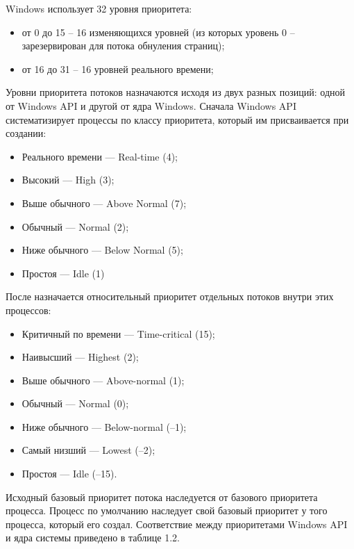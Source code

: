 Windows использует 32 уровня приоритета:
\begin{itemize}
	\item от 0 до 15 – 16 изменяющихся уровней (из которых уровень 0 – зарезервирован для потока обнуления страниц);
	\item от 16 до 31 – 16 уровней реального времени;
\end{itemize}
Уровни приоритета потоков назначаются исходя из двух разных позиций: одной от Windows API и другой от ядра Windows.
Сначала Windows API систематизирует процессы по классу приоритета, который им присваивается при создании:

\begin{itemize}
	\item Реального времени — Real-time (4);
	\item Высокий — High (3);
	\item Выше обычного — Above Normal (7);
	\item Обычный — Normal (2);
	\item Ниже обычного — Below Normal (5);
	\item Простоя — Idle (1)
\end{itemize}

После назначается относительный приоритет отдельных потоков внутри этих процессов:

\begin{itemize}
	\item Критичный по времени — Time-critical (15);
	\item Наивысший — Highest (2);
	\item Выше обычного — Above-normal (1);
	\item Обычный — Normal (0);
	\item Ниже обычного — Below-normal (–1);
	\item Самый низший — Lowest (–2);
	\item Простоя — Idle (–15).
\end{itemize}
Исходный базовый приоритет потока наследуется от базового приоритета процесса. 
Процесс по умолчанию наследует свой базовый приоритет у того процесса, который его создал. 
Соответствие между приоритетами Windows API и ядра системы приведено в таблице 1.2.



